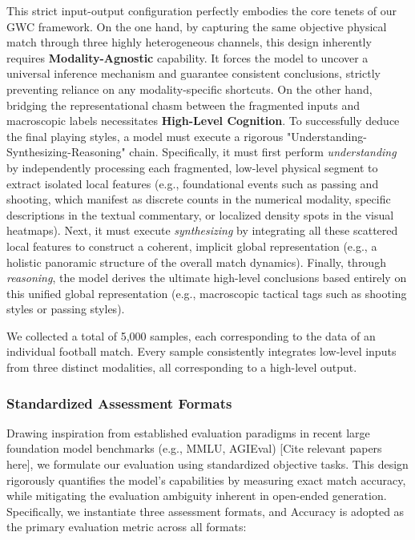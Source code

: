 This strict input-output configuration perfectly embodies the core tenets of our GWC framework. On the one hand, by capturing the same objective physical match through three highly heterogeneous channels, this design inherently requires \textbf{Modality-Agnostic} capability. It forces the model to uncover a universal inference mechanism and guarantee consistent conclusions, strictly preventing reliance on any modality-specific shortcuts. On the other hand, bridging the representational chasm between the fragmented inputs and macroscopic labels necessitates \textbf{High-Level Cognition}. To successfully deduce the final playing styles, a model must execute a rigorous "Understanding-Synthesizing-Reasoning" chain. Specifically, it must first perform \textit{understanding} by independently processing each fragmented, low-level physical segment to extract isolated local features (e.g., foundational events such as passing and shooting, which manifest as discrete counts in the numerical modality, specific descriptions in the textual commentary, or localized density spots in the visual heatmaps). Next, it must execute \textit{synthesizing} by integrating all these scattered local features to construct a coherent, implicit global representation (e.g., a holistic panoramic structure of the overall match dynamics). Finally, through \textit{reasoning}, the model derives the ultimate high-level conclusions based entirely on this unified global representation (e.g., macroscopic tactical tags such as shooting styles or passing styles).

We collected a total of 5,000 samples, each corresponding to the data of an individual football match. Every sample consistently integrates low-level inputs from three distinct modalities, all corresponding to a high-level output.

\subsubsection{Standardized Assessment Formats}
Drawing inspiration from established evaluation paradigms in recent large foundation model benchmarks (e.g., MMLU, AGIEval) [Cite relevant papers here], we formulate our evaluation using standardized objective tasks. This design rigorously quantifies the model's capabilities by measuring exact match accuracy, while mitigating the evaluation ambiguity inherent in open-ended generation. Specifically, we instantiate three assessment formats, and Accuracy is adopted as the primary evaluation metric across all formats:

